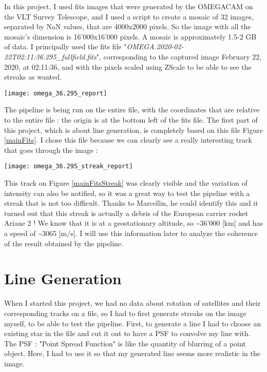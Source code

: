\documentclass[a4paper,12pt,oneside]{report}
\begin{document}
In this project, I used fits images that were generated by the OMEGACAM on the VLT Survey Telescope, and I used a script to create a 
mosaic of 32 images, separated by NaN values, that are 4000x2000 pixels. So the image with all the mosaic's dimension is 16'000x16'000 pixels. 
A mosaic is approximately 1.5-2 GB of data. 
\newline
I principally used the fits file "\emph{OMEGA.2020-02-22T02:11:36.295\_fullfield.fits}", corresponding to the
captured image February 22, 2020, at 02:11:36, and with the pixels scaled using ZScale to be able to see the streaks as wanted.
\newline
\begin{center}
    \texttt{[image: omega\_36.295\_report]}
    \label{mainFits}
\end{center}
The pipeline is being run on the entire file, with the coordinates that are relative to the entire file : the origin is at the bottom left of
the fits file. The first part of this project, which is about line generation, is completely based on this file Figure \ref{mainFits}. I chose
this file because we can clearly see a really interesting track that goes through the image :
\begin{center}
    \texttt{[image: omega\_36.295\_streak\_report]}
    \label{mainFitsStreak}
\end{center}
This track on Figure \ref{mainFitsStreak} was clearly visible and the variation of intensity can also be notified, so it was a great way to test the pipeline with a 
streak that is not too difficult. Thanks to Marcellin, he could identify this and it turned out that this streak is actually a debris of the European 
carrier rocket Ariane 2 ! We know that it is at a geostationary altitude, so \textasciitilde 36'000 [km] and has a speed of \textasciitilde 3065 [m/s]. I will use this
information later to analyze the coherence of the result obtained by the pipeline.

\chapter{Line Generation}

When I started this project, we had no data about rotation of satellites and their corresponding tracks on a file, so I had to first 
generate streaks on the image myself, to be able to test the pipeline. First, to generate a line I had to choose an existing star in the file
and cut it out to have a PSF to convolve my line with. The PSF : "Point Spread Function" is like the quantity of blurring of a point object.
Here, I had to use it so that my generated line seems more realistic in the image. 
\end{document}
